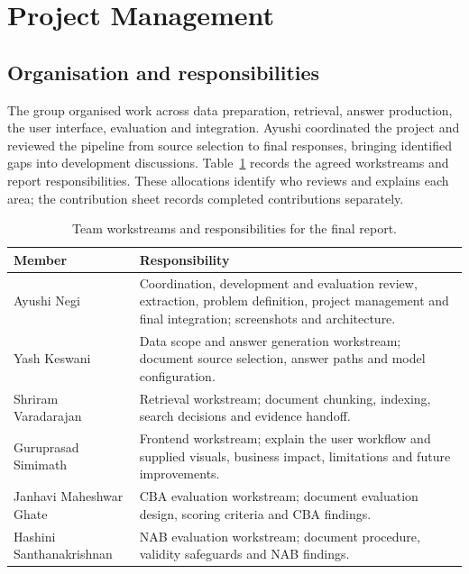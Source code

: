 \section{Project Management}
\label{sec:Project Management}

\subsection{Organisation and responsibilities}
The group organised work across data preparation, retrieval, answer production, the user interface, evaluation and integration. Ayushi coordinated the project and reviewed the pipeline from source selection to final responses, bringing identified gaps into development discussions. Table~\ref{tab:report_responsibilities} records the agreed workstreams and report responsibilities. These allocations identify who reviews and explains each area; the contribution sheet records completed contributions separately.

\begin{table}[htbp]
\centering
\small
\caption{Team workstreams and responsibilities for the final report.}
\label{tab:report_responsibilities}
\begin{tabular}{p{}p{}}
\toprule
Member & Responsibility \\
\midrule
Ayushi Negi & Coordination, development and evaluation review, extraction, problem definition, project management and final integration; screenshots and architecture. \\
Yash Keswani & Data scope and answer generation workstream; document source selection, answer paths and model configuration. \\
Shriram Varadarajan & Retrieval workstream; document chunking, indexing, search decisions and evidence handoff. \\
Guruprasad Simimath & Frontend workstream; explain the user workflow and supplied visuals, business impact, limitations and future improvements. \\
Janhavi Maheshwar Ghate & CBA evaluation workstream; document evaluation design, scoring criteria and CBA findings. \\
Hashini Santhanakrishnan & NAB evaluation workstream; document procedure, validity safeguards and NAB findings. \\
\bottomrule
\end{tabular}
\end{table}

